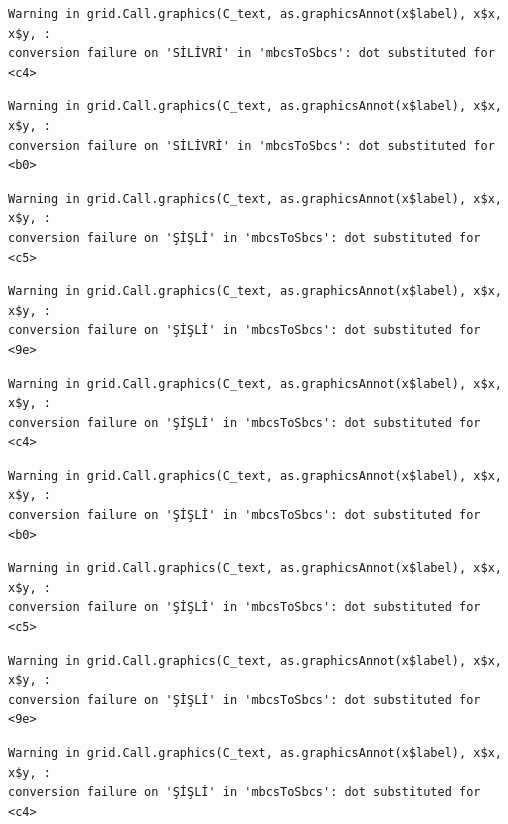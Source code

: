 \documentclass[
  11pt,
  a4paper,
  DIV=11,
  numbers=noendperiod]{scrartcl}
\begin{document}
\begin{verbatim}
Warning in grid.Call.graphics(C_text, as.graphicsAnnot(x$label), x$x, x$y, :
conversion failure on 'SİLİVRİ' in 'mbcsToSbcs': dot substituted for <c4>
\end{verbatim}

\begin{verbatim}
Warning in grid.Call.graphics(C_text, as.graphicsAnnot(x$label), x$x, x$y, :
conversion failure on 'SİLİVRİ' in 'mbcsToSbcs': dot substituted for <b0>
\end{verbatim}

\begin{verbatim}
Warning in grid.Call.graphics(C_text, as.graphicsAnnot(x$label), x$x, x$y, :
conversion failure on 'ŞİŞLİ' in 'mbcsToSbcs': dot substituted for <c5>
\end{verbatim}

\begin{verbatim}
Warning in grid.Call.graphics(C_text, as.graphicsAnnot(x$label), x$x, x$y, :
conversion failure on 'ŞİŞLİ' in 'mbcsToSbcs': dot substituted for <9e>
\end{verbatim}

\begin{verbatim}
Warning in grid.Call.graphics(C_text, as.graphicsAnnot(x$label), x$x, x$y, :
conversion failure on 'ŞİŞLİ' in 'mbcsToSbcs': dot substituted for <c4>
\end{verbatim}

\begin{verbatim}
Warning in grid.Call.graphics(C_text, as.graphicsAnnot(x$label), x$x, x$y, :
conversion failure on 'ŞİŞLİ' in 'mbcsToSbcs': dot substituted for <b0>
\end{verbatim}

\begin{verbatim}
Warning in grid.Call.graphics(C_text, as.graphicsAnnot(x$label), x$x, x$y, :
conversion failure on 'ŞİŞLİ' in 'mbcsToSbcs': dot substituted for <c5>
\end{verbatim}

\begin{verbatim}
Warning in grid.Call.graphics(C_text, as.graphicsAnnot(x$label), x$x, x$y, :
conversion failure on 'ŞİŞLİ' in 'mbcsToSbcs': dot substituted for <9e>
\end{verbatim}

\begin{verbatim}
Warning in grid.Call.graphics(C_text, as.graphicsAnnot(x$label), x$x, x$y, :
conversion failure on 'ŞİŞLİ' in 'mbcsToSbcs': dot substituted for <c4>
\end{verbatim}
\end{document}
